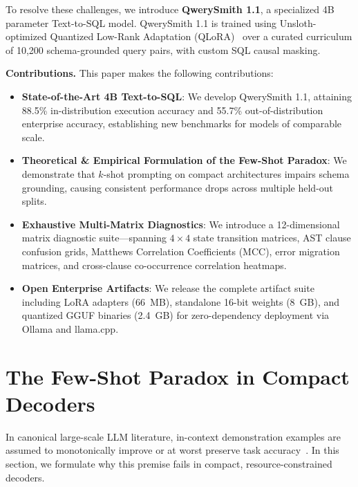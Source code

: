 \documentclass[10pt,twocolumn,letterpaper]{article}
\theoremstyle{definition}
\begin{document}
To resolve these challenges, we introduce \textbf{QwerySmith 1.1}, a specialized 4B parameter Text-to-SQL model. QwerySmith 1.1 is trained using Unsloth-optimized Quantized Low-Rank Adaptation (QLoRA)~\cite{dettmers2023qlora,unsloth2023} over a curated curriculum of 10,200 schema-grounded query pairs, with custom SQL causal masking.

\noindent\textbf{Contributions.} This paper makes the following contributions:
\begin{itemize}
    \item \textbf{State-of-the-Art 4B Text-to-SQL}: We develop QwerySmith 1.1, attaining 88.5\% in-distribution execution accuracy and 55.7\% out-of-distribution enterprise accuracy, establishing new benchmarks for models of comparable scale.
    \item \textbf{Theoretical \& Empirical Formulation of the Few-Shot Paradox}: We demonstrate that $k$-shot prompting on compact architectures impairs schema grounding, causing consistent performance drops across multiple held-out splits.
    \item \textbf{Exhaustive Multi-Matrix Diagnostics}: We introduce a 12-dimensional matrix diagnostic suite—spanning $4\times4$ state transition matrices, AST clause confusion grids, Matthews Correlation Coefficients (MCC), error migration matrices, and cross-clause co-occurrence correlation heatmaps.
    \item \textbf{Open Enterprise Artifacts}: We release the complete artifact suite including LoRA adapters (66~MB), standalone 16-bit weights (8~GB), and quantized GGUF binaries (2.4~GB) for zero-dependency deployment via Ollama and llama.cpp.
\end{itemize}

\section{The Few-Shot Paradox in Compact Decoders}
\label{sec:paradox}

In canonical large-scale LLM literature, in-context demonstration examples are assumed to monotonically improve or at worst preserve task accuracy~\cite{brown2020fewshot}. In this section, we formulate why this premise fails in compact, resource-constrained decoders.
\end{document}
